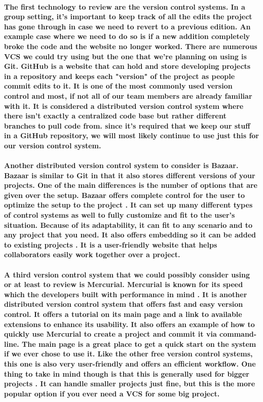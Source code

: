 \documentclass[letterpaper, 10pt, draftclsnofoot, onecolumn, IEEETran]{article}
\begin{document}
\paragraph{The first technology to review are the version control systems. In a group setting, it's important to keep track of all the edits the project has gone through in case we need to revert to a previous edition. An example case where we need to do so is if a new addition completely broke the code and the website no longer worked. There are numerous VCS we could try using but the one that we're planning on using is Git. GitHub is a website that can hold and store developing projects in a repository and keeps each "version" of the project as people commit edits to it. It is one of the most commonly used version control and most, if not all of our team members are already familiar with it. It is considered a distributed version control system where there isn't exactly a centralized code base but rather different branches to pull code from. since it's required that we keep our stuff in a GitHub repository, we will most likely continue to use just this for our version control system.}

\paragraph{Another distributed version control system to consider is Bazaar. Bazaar is similar to Git in that it also stores different versions of your projects. One of the main differences is the number of options that are given over the setup. Bazaar offers complete control for the user to optimize the setup to the project \cite{VCS}. It can set up many different types of control systems as well to fully customize and fit to the user's situation. Because of its adaptability, it can fit to any scenario and to any project that you need. It also offers embedding so it can be added to existing projects \cite{VCS}. It is a user-friendly website that helps collaborators easily work together over a project.}

\paragraph{A third version control system that we could possibly consider using or at least to review is Mercurial. Mercurial is known for its speed which the developers built with performance in mind \cite{VCS}. It is another distributed version control system that offers fast and easy version control. It offers a tutorial on its main page and a link to available extensions to enhance its usability. It also offers an example of how to quickly use Mercurial to create a project and commit it via command-line. The main page is a great place to get a quick start on the system if we ever chose to use it. Like the other free version control systems, this one is also very user-friendly and offers an efficient workflow. One thing to take in mind though is that this is generally used for bigger projects \cite{Merc}. It can handle smaller projects just fine, but this is the more popular option if you ever need a VCS for some big project.}
\end{document}
